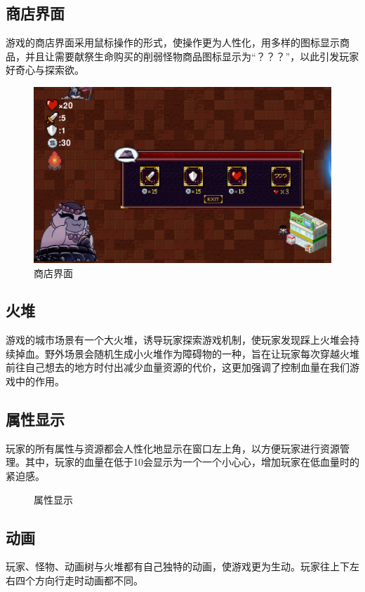 \documentclass{ctexart}
\begin{document}
\subsection{商店界面}
游戏的商店界面采用鼠标操作的形式，使操作更为人性化，用多样的图标显示商品，并且让需要献祭生命购买的削弱怪物商品图标显示为“？？？”，以此引发玩家好奇心与探索欲。
\begin{figure}[h]
\centering
\includegraphics[width=0.75\linewidth]{商店.png}
\caption{\label{fig:商店}商店界面}
\end{figure}

\subsection{火堆}
游戏的城市场景有一个大火堆，诱导玩家探索游戏机制，使玩家发现踩上火堆会持续掉血。野外场景会随机生成小火堆作为障碍物的一种，旨在让玩家每次穿越火堆前往自己想去的地方时付出减少血量资源的代价，这更加强调了控制血量在我们游戏中的作用。

\subsection{属性显示}
玩家的所有属性与资源都会人性化地显示在窗口左上角，以方便玩家进行资源管理。其中，玩家的血量在低于10会显示为一个一个小心心，增加玩家在低血量时的紧迫感。
\begin{figure}[h]
\centering
{}
\caption{\label{fig:属性显示}属性显示}
\end{figure}

\subsection{动画}
玩家、怪物、动画树与火堆都有自己独特的动画，使游戏更为生动。玩家往上下左右四个方向行走时动画都不同。
\end{document}
